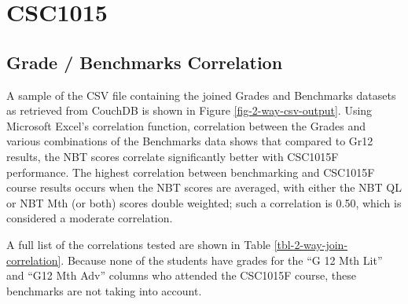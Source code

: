 \section{CSC1015}
\subsection{Grade / Benchmarks Correlation}
A sample of the CSV file containing the joined Grades and Benchmarks datasets as retrieved from CouchDB is shown in Figure \ref{fig-2-way-csv-output}. Using Microsoft Excel's correlation function, correlation between the Grades and various combinations of the Benchmarks data shows that compared to Gr12 results, the NBT scores correlate significantly better with CSC1015F performance. The highest correlation between benchmarking and CSC1015F course results occurs when the NBT scores are averaged, with either the NBT QL or NBT Mth (or both) scores double weighted; such a correlation is 0.50, which is considered a moderate correlation.

A full list of the correlations tested are shown in Table \ref{tbl-2-way-join-correlation}. Because none of the students have grades for the ``G 12 Mth Lit'' and ``G12 Mth Adv'' columns who attended the CSC1015F course, these benchmarks are not taking into account.